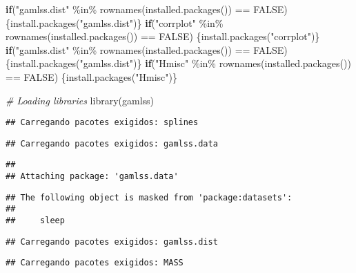 \documentclass[
]{article}
\newenvironment{Shaded}{\begin{snugshade}}{\end{snugshade}}
\newcommand{\CommentTok}[1]{\textcolor[rgb]{0.56,0.35,0.01}{\textit{#1}}}
\newcommand{\ConstantTok}[1]{\textcolor[rgb]{0.00,0.00,0.00}{#1}}
\newcommand{\ControlFlowTok}[1]{\textcolor[rgb]{0.13,0.29,0.53}{\textbf{#1}}}
\newcommand{\FunctionTok}[1]{\textcolor[rgb]{0.00,0.00,0.00}{#1}}
\newcommand{\NormalTok}[1]{#1}
\newcommand{\SpecialCharTok}[1]{\textcolor[rgb]{0.00,0.00,0.00}{#1}}
\newcommand{\StringTok}[1]{\textcolor[rgb]{0.31,0.60,0.02}{#1}}
\begin{document}
\begin{Shaded}
\begin{Highlighting}[]
\ControlFlowTok{if}\NormalTok{(}\StringTok{"gamlss.dist"} \SpecialCharTok{\%in\%} \FunctionTok{rownames}\NormalTok{(}\FunctionTok{installed.packages}\NormalTok{()) }\SpecialCharTok{==} \ConstantTok{FALSE}\NormalTok{) \{}\FunctionTok{install.packages}\NormalTok{(}\StringTok{"gamlss.dist"}\NormalTok{)\}}
\ControlFlowTok{if}\NormalTok{(}\StringTok{"corrplot"} \SpecialCharTok{\%in\%} \FunctionTok{rownames}\NormalTok{(}\FunctionTok{installed.packages}\NormalTok{()) }\SpecialCharTok{==} \ConstantTok{FALSE}\NormalTok{) \{}\FunctionTok{install.packages}\NormalTok{(}\StringTok{"corrplot"}\NormalTok{)\}}
\ControlFlowTok{if}\NormalTok{(}\StringTok{"gamlss.dist"} \SpecialCharTok{\%in\%} \FunctionTok{rownames}\NormalTok{(}\FunctionTok{installed.packages}\NormalTok{()) }\SpecialCharTok{==} \ConstantTok{FALSE}\NormalTok{) \{}\FunctionTok{install.packages}\NormalTok{(}\StringTok{"gamlss.dist"}\NormalTok{)\}}
\ControlFlowTok{if}\NormalTok{(}\StringTok{"Hmisc"} \SpecialCharTok{\%in\%} \FunctionTok{rownames}\NormalTok{(}\FunctionTok{installed.packages}\NormalTok{()) }\SpecialCharTok{==} \ConstantTok{FALSE}\NormalTok{) \{}\FunctionTok{install.packages}\NormalTok{(}\StringTok{"Hmisc"}\NormalTok{)\}}

\CommentTok{\# Loading libraries}
\FunctionTok{library}\NormalTok{(gamlss)}
\end{Highlighting}
\end{Shaded}

\begin{verbatim}
## Carregando pacotes exigidos: splines
\end{verbatim}

\begin{verbatim}
## Carregando pacotes exigidos: gamlss.data
\end{verbatim}

\begin{verbatim}
## 
## Attaching package: 'gamlss.data'
\end{verbatim}

\begin{verbatim}
## The following object is masked from 'package:datasets':
## 
##     sleep
\end{verbatim}

\begin{verbatim}
## Carregando pacotes exigidos: gamlss.dist
\end{verbatim}

\begin{verbatim}
## Carregando pacotes exigidos: MASS
\end{verbatim}
\end{document}
